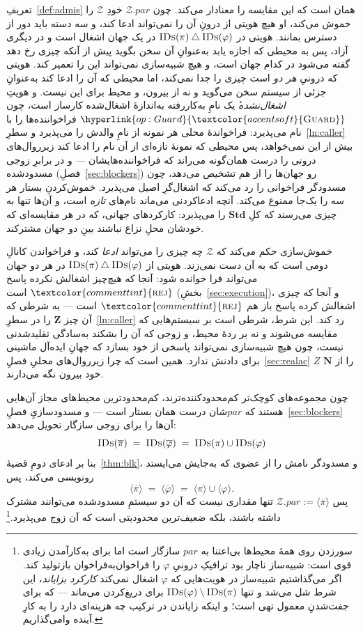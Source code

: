 \documentclass[10pt,oneside,openany]{book}
\newcommand{\admits}{\mathbf{N}}
\newcommand{\Zpid}{\mathbf{Z}}
\newcommand{\Stdpid}{\mathbf{Std}}
\newcommand{\pars}{\mathit{par}}
\newcommand{\Zenv}{\mathcal{Z}}
\newcommand{\op}[1]{\textnormal{\textsc{#1}}}
\newcommand{\opl}[1]{\hyperlink{op:#1}{\textcolor{accentsoft}{\op{#1}}}}
\newcommand{\IDs}{\op{IDs}}
\newcommand{\atom}[1]{\textcolor{commenttint}{\op{#1}}}
\newcommand{\rej}{\atom{rej}}
\newcommand{\ncl}[1]{\langle #1 \rangle}
\theoremstyle{accentdef}
\theoremstyle{accentplain}
\begin{document}
تعریفِ~\ref{def:admis} همان است که این مقایسه را معنادار می‌کند. چون
$\Zenv.\pars$ خودِ $\Zenv$ را خموش می‌کند، او هیچ هویتی از درونِ آن را
نمی‌تواند ادعا کند، و سه دسته باید دور از دسترس بمانند. هویتی در
$\IDs(\pi) \mathbin{\triangle} \IDs(\varphi)$ در یک جهان اشغال است و در
دیگری آزاد، پس به محیطی که اجازه یابد به‌عنوانِ آن سخن بگوید پیش از آنکه
چیزی رخ دهد گفته می‌شود در کدام جهان است، و هیچ شبیه‌سازی نمی‌تواند این
را تعمیر کند. هویتی که درونیِ \emph{هر دو} است چیزی را جدا نمی‌کند، اما
محیطی که آن را ادعا کند به‌عنوانِ جزئی از سیستم سخن می‌گوید و نه از
بیرون، و محیط برای این نیست. و هویتِ \emph{اشغال‌نشده}ٔ یک نامِ به‌کاررفته
به‌اندازهٔ اشغال‌شده کارساز است، چون $\opl{Guard}$ فراخواننده‌ها را با نام
می‌پذیرد: فراخواندهٔ محلی هر نمونه از نامِ والدش را می‌پذیرد و
سطرِ~\ref{ln:caller} بیش از این نمی‌خواهد، پس محیطی که نمونهٔ تازه‌ای از
آن نام را ادعا کند زیرروال‌های درونی را درست همان‌گونه می‌راند که
فراخواننده‌هایشان --- و در برابرِ زوجی مسدودشده
(فصلِ~\ref{sec:blockers}) رو جهان‌ها را از هم تشخیص می‌دهد، چون مسدودگر
فراخوانی را رد می‌کند که اشغال‌گرِ اصیل می‌پذیرد. خموش‌کردنِ بستار هر سه
را یک‌جا ممنوع می‌کند. آنچه ادعاکردنی می‌ماند نام‌های \emph{تازه} است، و
آن‌ها تنها به چیزی می‌رسند که کلِ $\Stdpid$ را می‌پذیرد: کارکردهای جهانی،
که در هر مقایسه‌ای که خودشان محلِ نزاع نباشند بینِ دو جهان مشترکند.

خموش‌سازی حکم می‌کند که $\Zenv$ چه چیزی را می‌تواند \emph{ادعا} کند، و
فراخواندن کانالِ دومی است که به آن دست نمی‌زند. هویتی از $\IDs(\pi)
\mathbin{\triangle} \IDs(\varphi)$ در هر دو جهان می‌تواند فرا خوانده شود:
آنجا که هیچ‌چیز اشغالش نکرده پاسخ $\rej$ است
(بخشِ~\ref{sec:execution})، و آنجا که چیزی اشغالش کرده پاسخ باز هم $\rej$
است --- به شرطی که آن چیز $\Zpid$ را در سطرِ~\ref{ln:caller} رد کند. این
شرط، شرطی است بر سیستم‌هایی که مقایسه می‌شوند و نه بر ردهٔ محیط، و زوجی
که آن را بشکند به‌سادگی تقلیدشدنی نیست، چون هیچ شبیه‌سازی نمی‌تواند پاسخی
از خود بسازد که جهانِ ایده‌آل ماشینی برای دادنش ندارد. همین است که چرا
زیرروال‌های محلیِ فصلِ~\ref{sec:realac} $Z$ را از $\admits$ خود بیرون
نگه می‌دارند.

چون مجموعه‌های کوچک‌تر کم‌محدودکننده‌ترند، کم‌محدودترین محیط‌های مجاز
آن‌هایی هستند که $\pars$شان درست همان بستار است --- و مسدودسازیِ
فصلِ~\ref{sec:blockers} آن‌ها را برای زوجی سازگار تحویل می‌دهد:
\[
  \IDs(\overline{\pi}) \;=\; \IDs(\overline{\varphi}) \;=\; \IDs(\pi) \cup \IDs(\varphi)
\]
بنا بر ادعای دومِ قضیهٔ~\ref{thm:blk}، و مسدودگر نامش را از عضوی که
به‌جایش می‌ایستد رونویسی می‌کند، پس
\[
  \ncl{\overline{\pi}} \;=\; \ncl{\overline{\varphi}} \;=\; \ncl{\pi} \cup \ncl{\varphi} .
\]
پس $\Zenv.\pars := \ncl{\overline{\pi}}$ تنها مقداری نیست که آن دو سیستمِ
مسدودشده می‌توانند مشترک داشته باشند، بلکه ضعیف‌ترین محدودیتی است که آن
زوج می‌پذیرد.\footnote{سور‌زدن روی همهٔ محیط‌ها بی‌اعتنا به $\pars$ سازگار
است اما برای به‌کارآمدن زیادی قوی است: شبیه‌ساز ناچار بود ترافیکِ درونیِ
$\varphi$ را فراخوان‌به‌فراخوان بازتولید کند. اگر می‌گذاشتیم شبیه‌ساز در
هویت‌هایی که $\varphi$ اشغال نمی‌کند \emph{کارکرد بزایاند}، این شرط شل
می‌شد و تنها $\IDs(\varphi) \setminus \IDs(\pi)$ برای دریغ‌کردن می‌ماند ---
که برای جفت‌شدنِ معمول تهی است؛ و اینکه زایاندن در ترکیب چه هزینه‌ای دارد
را به کارِ آینده وامی‌گذاریم.}
\end{document}
